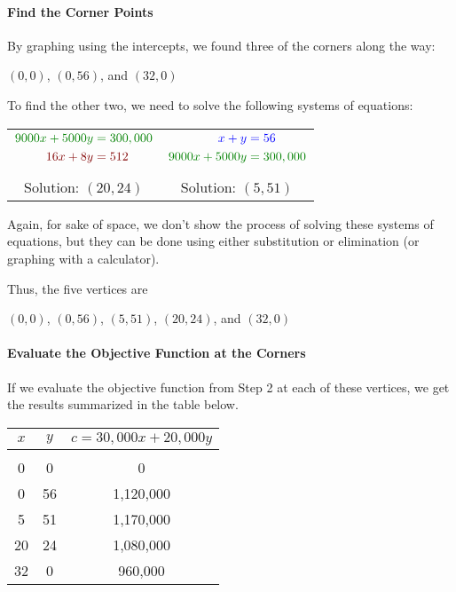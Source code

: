 \paragraph{Find the Corner Points} By graphing using the intercepts, we found three of the corners along the way:
\begin{center}
$(0,0)$, $(0,56)$, and $(32,0)$
\end{center}
To find the other two, we need to solve the following systems of equations:
\begin{center}
\begin{tabular}{c c}
{$\begin{aligned}
\color{green!50!black}9000x+5000y &\color{green!50!black}= 300,000\\
\color{red!50!black}16x+8y &\color{red!50!black}= 512
\end{aligned}$} \hspace*{0.75in}
& 
{$\begin{aligned}
\color{blue}x+y &\color{blue}= 56\\
\color{green!50!black}9000x+5000y &\color{green!50!black}= 300,000
\end{aligned}$}\\
& \\
Solution: $(20,24)$ \hspace*{0.75in} & Solution: $(5,51)$
\end{tabular}
\end{center}

Again, for sake of space, we don't show the process of solving these systems of equations, but they can be done using either substitution or elimination (or graphing with a calculator).

Thus, the five vertices are
\begin{center} 
$(0,0)$, $(0,56)$, $(5,51)$, $(20,24)$, and $(32,0)$
\end{center}

\paragraph{Evaluate the Objective Function at the Corners} If we evaluate the objective function from Step 2 at each of these vertices, we get the results summarized in the table below.
\begin{center}
\begin{tabular}{|c c | c|}
\hline
$x$ & $y$ & $c=30,000x+20,000y$\\
\hline
& & \\
0 & 0 & 0\\
0 & 56 & 1,120,000\\
\rowcolor{green!30!white}5 & 51 & 1,170,000\\
20 & 24 & 1,080,000\\
32 & 0 & 960,000\\
\hline
\end{tabular}
\end{center}

